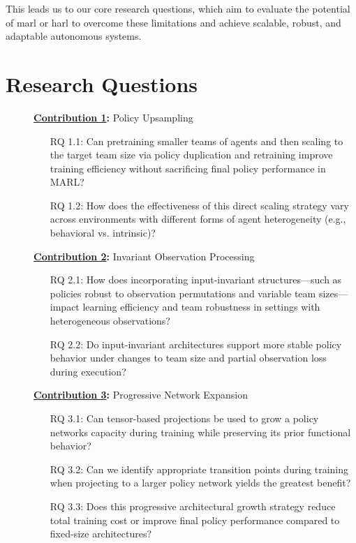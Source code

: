 This leads us to our core research questions, which aim to evaluate
the potential of \gls{marl} or \gls{harl} to overcome these limitations 
and achieve scalable, robust, and adaptable autonomous systems.


\section{Research Questions}%
\label{sec:research_question}%
\label{sec:relevance_and_importance}

\begin{description}
    \item[] \textbf{\hyperref[ch:contribution_1]{Contribution 1}:} Policy Upsampling
    \begin{itemize}
        \item[RQ 1.1:] Can pretraining smaller teams of agents and then scaling to the target 
        team size via policy duplication and retraining improve training efficiency 
        without sacrificing final policy performance in MARL?
        \item[RQ 1.2:] How does the effectiveness of this direct scaling strategy vary across 
        environments with different forms of agent heterogeneity 
        (e.g., behavioral vs. intrinsic)?
    \end{itemize}
    \item[]\textbf{\hyperref[ch:contribution_2]{Contribution 2}:} Invariant Observation Processing
    \begin{itemize}
        \item[RQ 2.1:] How does incorporating input-invariant structures—such as policies 
        robust to observation permutations and variable team sizes—impact learning efficiency 
        and team robustness in settings with heterogeneous observations?
        \item[RQ 2.2:] Do input-invariant architectures support more stable policy behavior 
        under changes to team size and partial observation loss during execution?
    \end{itemize}
    \item[] \textbf{\hyperref[ch:contribution_3]{Contribution 3}:} Progressive Network Expansion
    \begin{itemize}
        \item[RQ 3.1:] Can tensor-based projections be used to grow a policy networks 
        capacity during training while preserving its prior functional behavior?
        \item[RQ 3.2:] Can we identify appropriate transition points during training 
        when projecting to a larger policy network yields the greatest benefit?
        \item[RQ 3.3:] Does this progressive architectural growth strategy reduce total training 
        cost or improve final policy performance compared to fixed-size architectures?
    \end{itemize}
\end{description}


